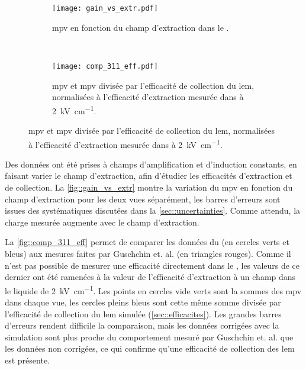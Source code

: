       \begin{figure}[htbp]
        \centering
        \begin{subfigure}[t]{0.9\textwidth}
          \centering
          \texttt{[image: gain\_vs\_extr.pdf]}
        \caption[MPV en fonction du champ d'extraction dans le \TOO{}]{\label{fig::gain_vs_extr}\gls{mpv} en fonction du champ d'extraction dans le \TOO{}.}
        \end{subfigure}\\
        \begin{subfigure}[t]{0.9\textwidth}
          \centering
          \texttt{[image: comp\_311\_eff.pdf]}
          \caption[MPV et MPV divisée par l'efficacité de collection du LEM, normalisées à l'efficacité d'extraction]{\label{fig::comp_311_eff}\gls{mpv} et \gls{mpv} divisée par l'efficacité de collection du \gls{lem}, normalisées à l'efficacité d'extraction mesurée dans \cite{guschin} à \SI{2}{\kilo\volt\per\centi\meter}.}
        \end{subfigure}
      \end{figure}
      Des données ont été prises à champs d'amplification et d'induction constants, en faisant varier le champ d'extraction, afin d'étudier les efficacités d'extraction et de collection. La \autoref{fig::gain_vs_extr} montre la variation du \gls{mpv} en fonction du champ d'extraction pour les deux vues séparément, les barres d'erreurs sont issues des systématiques discutées dans la \autoref{sec::uncertainties}. Comme attendu, la charge mesurée augmente avec le champ d'extraction.

      La \autoref{fig::comp_311_eff} permet de comparer les données du \TOO{} (en cercles verts et bleus) aux mesures faites par Guschchin et. al.\cite{guschin} (en triangles rouges). Comme il n'est pas possible de mesurer une efficacité directement dans le \TOO{}, les valeurs de ce dernier ont été ramenées à la valeur de l'efficacité d'extraction à un champ dans le liquide de \SI{2}{\kilo\volt\per\centi\meter}. Les points en cercles vide verts sont la sommes des \gls{mpv} dans chaque vue, les cercles pleins bleus sont cette même somme divisée par l'efficacité de collection du \gls{lem} simulée (\autoref{sec::efficacites}). Les grandes barres d'erreurs rendent difficile la comparaison, mais les données corrigées avec la simulation sont plus proche du comportement mesuré par Guschchin et. al. que les données non corrigées, ce qui confirme qu'une efficacité de collection des \gls{lem} est présente.

